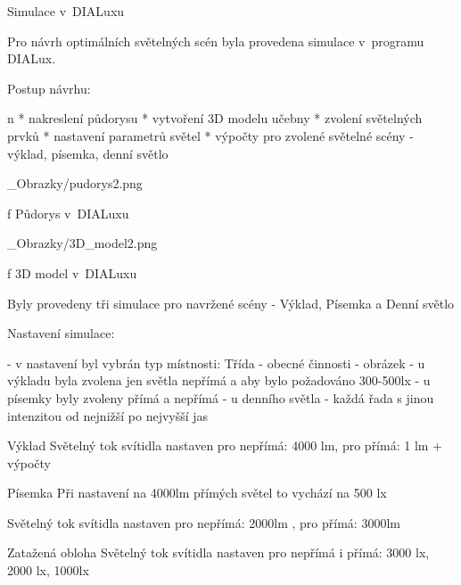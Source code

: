 \chap Simulace v~DIALuxu

Pro návrh optimálních světelných scén byla provedena simulace v~programu DIALux.

\medskip
Postup návrhu:

\begitems \style n
* nakreslení půdorysu
* vytvoření 3D modelu učebny
* zvolení světelných prvků
* nastavení parametrů světel
* výpočty pro zvolené světelné scény - výklad, písemka, denní světlo
\enditems
\medskip

\medskip {}
\picw=8cm _Obrazky/pudorys2.png
\caption/f Půdorys v~DIALuxu
\medskip

\medskip {}
\picw=8cm _Obrazky/3D_model2.png
\caption/f 3D model v~DIALuxu
\medskip

Byly provedeny tři simulace pro navržené scény - Výklad, Písemka a Denní světlo

Nastavení simulace:

- v nastavení byl vybrán typ místnosti: Třída - obecné činnosti
- obrázek
- u výkladu byla zvolena jen světla nepřímá a aby bylo požadováno 300-500lx
- u písemky byly zvoleny přímá a nepřímá 
- u denního světla - každá řada s jinou intenzitou od nejnižší po nejvyšší jas

Výklad 
Světelný tok svítidla nastaven pro nepřímá: 4000 lm, pro přímá: 1 lm
+ výpočty

Písemka
Při nastavení na 4000lm přímých světel to vychází na 500 lx

Světelný tok svítidla nastaven pro nepřímá: 2000lm , pro přímá: 3000lm

Zatažená obloha
Světelný tok svítidla nastaven pro nepřímá i přímá: 3000 lx, 2000 lx, 1000lx